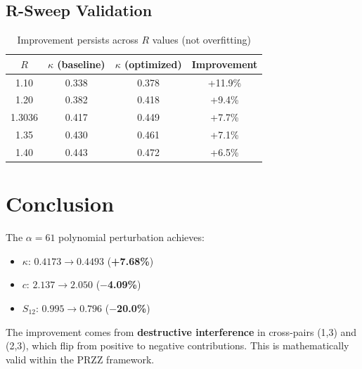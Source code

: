 \documentclass[11pt]{article}
\begin{document}
\subsection{R-Sweep Validation}

\begin{table}[h]
\centering
\begin{tabular}{cccc}
\toprule
$R$ & $\kappa$ (baseline) & $\kappa$ (optimized) & Improvement \\
\midrule
1.10 & 0.338 & 0.378 & +11.9\% \\
1.20 & 0.382 & 0.418 & +9.4\% \\
1.3036 & 0.417 & 0.449 & +7.7\% \\
1.35 & 0.430 & 0.461 & +7.1\% \\
1.40 & 0.443 & 0.472 & +6.5\% \\
\bottomrule
\end{tabular}
\caption{Improvement persists across $R$ values (not overfitting)}
\end{table}

\section{Conclusion}

The $\alpha = 61$ polynomial perturbation achieves:
\begin{itemize}
\item $\kappa$: $0.4173 \to 0.4493$ (\textbf{+7.68\%})
\item $c$: $2.137 \to 2.050$ (\textbf{$-$4.09\%})
\item $S_{12}$: $0.995 \to 0.796$ (\textbf{$-$20.0\%})
\end{itemize}

The improvement comes from \textbf{destructive interference} in cross-pairs (1,3) and (2,3), which flip from positive to negative contributions. This is mathematically valid within the PRZZ framework.
\end{document}
